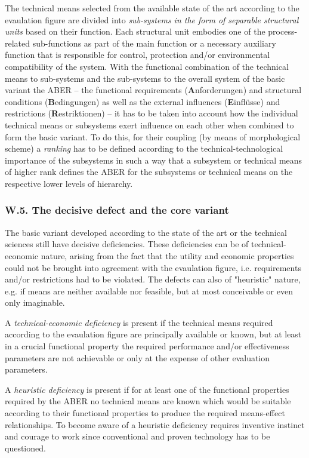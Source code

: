\documentclass[11pt,a4paper]{article}
\begin{document}
The technical means selected from the available state of the art according to
the evaulation figure are divided into \emph{sub-systems in the form of separable
  structural units} based on their function.  Each structural unit embodies
one of the process-related sub-functions as part of the main function or a
necessary auxiliary function that is responsible for control, protection
and/or environmental compatibility of the system. With the functional
combination of the technical means to sub-systems and the sub-systems to the
overall system of the basic variant the ABER -- the functional requirements
(\textbf{A}nforderungen) and structural conditions (\textbf{B}edingungen) as
well as the external influences (\textbf{E}infl\"usse) and restrictions
(\textbf{R}estriktionen) -- it has to be taken into account how the individual
technical means or subsystems exert influence on each other when combined to
form the basic variant. To do this, for their coupling (by means of
morphological scheme) a \emph{ranking} has to be defined according to the
technical-technological importance of the subsystems in such a way that a
subsystem or technical means of higher rank defines the ABER for the
subsystems or technical means on the respective lower levels of hierarchy.

\subsubsection*{W.5. The decisive defect and the core variant}

The basic variant developed according to the state of the art or the technical
sciences still have decisive deficiencies. These deficiencies can be of
technical-economic nature, arising from the fact that the utility and economic
properties could not be brought into agreement with the evaulation figure, i.e.
requirements and/or restrictions had to be violated. The defects can also of
"heuristic" nature, e.g. if means are neither available nor feasible, but at
most conceivable or even only imaginable.

A \emph{technical-economic deficiency} is present if the technical means
required according to the evaulation figure are principally available or known,
but at least in a crucial functional property the required performance and/or
effectiveness parameters are not achievable or only at the expense of other
evaluation parameters.

A \emph{heuristic deficiency} is present if for at least one of the functional
properties required by the ABER no technical means are known which would be
suitable according to their functional properties to produce the required
means-effect relationships. To become aware of a heuristic deficiency requires
inventive instinct and courage to work since conventional and proven
technology has to be questioned.
\end{document}
